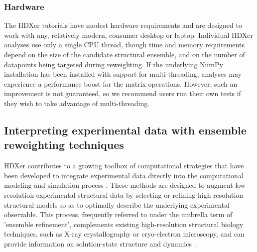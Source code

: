 \documentclass[9pt,tutorial]{livecoms}
\begin{document}
\subsubsection{Hardware}
The HDXer tutorials have modest hardware requirements and are designed to work with any, relatively modern, consumer desktop or laptop.
Individual HDXer analyses use only a single CPU thread, though time and memory requirements depend on the size of the candidate structural ensemble, and on the number of datapoints being targeted during reweighting.
If the underlying NumPy installation has been installed with support for multi-threading, analyses may experience a performance boost for the matrix operations.
However, such an improvement is not guaranteed, so we recommend users run their own tests if they wish to take advantage of multi-threading.

\subsection{Interpreting experimental data with ensemble reweighting techniques}\label{interpretingexptdata_sect}

HDXer contributes to a growing toolbox of computational strategies that have been developed to integrate experimental data directly into the computational modeling and simulation process \cite{Bonomi2017, Kofinger2019, Orioli2020}.
These methods are designed to augment low-resolution experimental structural data by selecting or refining high-resolution structural models so as to optimally describe the underlying experimental observable.
This process, frequently referred to under the umbrella term of 'ensemble refinement', complements existing high-resolution structural biology techniques, such as X-ray crystallography or cryo-electron microscopy, and can provide information on solution-state structure and dynamics \cite{Rozycki2011, Marinelli2015, Marinelli2019, Bottaro2018, Bengtsen2020, Cesari2016, Hustedt2018, Kofinger2019}.
\end{document}
